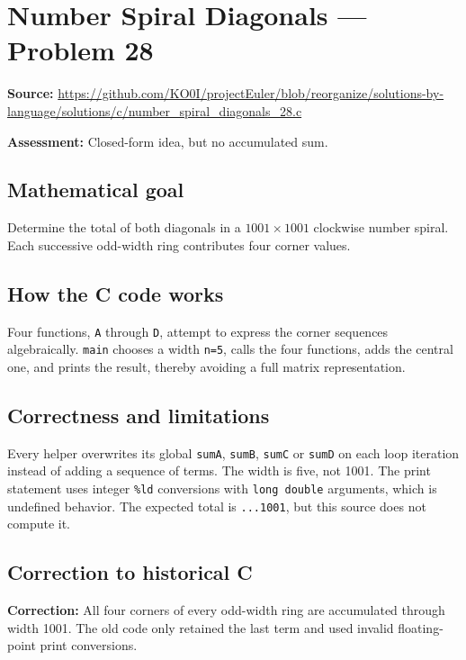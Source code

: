 \section{Number Spiral Diagonals --- Problem 28}
\label{prob:28}
\noindent\textbf{Source:} \url{https://github.com/KO0I/projectEuler/blob/reorganize/solutions-by-language/solutions/c/number_spiral_diagonals_28.c}

\noindent\textbf{Assessment:} Closed-form idea, but no accumulated sum.

\subsection*{Mathematical goal}
Determine the total of both diagonals in a \(1001\times1001\) clockwise number spiral. Each successive odd-width ring contributes four corner values.

\subsection*{How the C code works}
Four functions, \verb|A| through \verb|D|, attempt to express the corner sequences algebraically. \verb|main| chooses a width \verb|n=5|, calls the four functions, adds the central one, and prints the result, thereby avoiding a full matrix representation.

\subsection*{Correctness and limitations}
Every helper overwrites its global \verb|sumA|, \verb|sumB|, \verb|sumC| or \verb|sumD| on each loop iteration instead of adding a sequence of terms. The width is five, not 1001. The print statement uses integer \verb|%ld| conversions with \verb|long double| arguments, which is undefined behavior. The expected total is \texttt{...1001}, but this source does not compute it.


\subsection*{Correction to historical C}
{\color{red}\textbf{Correction:} All four corners of every odd-width ring are accumulated through width 1001. The old code only retained the last term and used invalid floating-point print conversions.}

